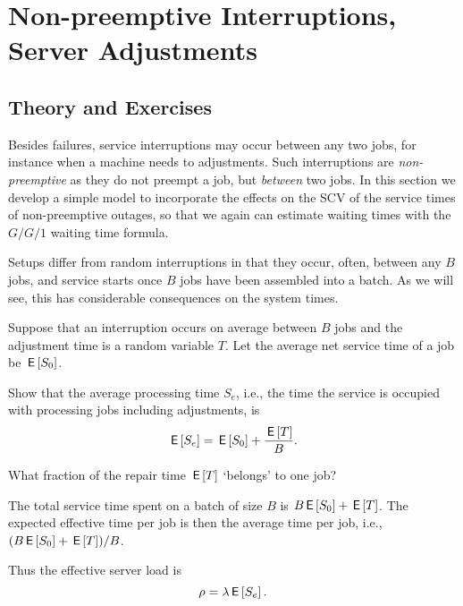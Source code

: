 \section{Non-preemptive Interruptions, Server Adjustments}
\label{sec:non-preempt-interr}

\subsection*{Theory and Exercises}



Besides failures, service interruptions  may occur between any two jobs, for instance when a machine needs to adjustments. Such interruptions are \emph{non-preemptive} as they do not preempt a job, 
but  \emph{between} two jobs.  In this section we develop a simple model to incorporate the effects on the SCV of the service times of non-preemptive outages, so that we again can estimate waiting times with the $G/G/1$ waiting time formula. 


Setups differ from random interruptions in that they occur, often, between any $B$ jobs, and service starts once $B$ jobs have been assembled into a batch. As we will see, this has considerable consequences on the system times. 


Suppose that an interruption occurs on average between $B$ jobs and the adjustment time is a random variable $T$. Let the average net service time of a job be $\,\mathsf{E}\left[S_0\right]$. 
\begin{exercise}
  Show that the average  processing time $S_e$, i.e., the time the service is occupied with processing jobs including adjustments, is 
  \begin{equation*}
    \,\mathsf{E}\left[S_e\right] = \,\mathsf{E}\left[S_0\right] + \frac{\,\mathsf{E}\left[T\right]} B.
  \end{equation*}
  \begin{hint}
    What fraction of the repair time $\,\mathsf{E}\left[T\right]$ `belongs' to one job?
  \end{hint}
  \begin{solution}
    The total service time spent on a batch of size $B$ is $B \,\mathsf{E}\left[S_0\right] + \,\mathsf{E}\left[T\right]$. The expected effective time per job is then the average time per job, i.e.,  $(B \,\mathsf{E}\left[S_0\right]+\,\mathsf{E}\left[T\right])/B$. 
  \end{solution}
\end{exercise}

Thus the effective server load is
\begin{equation*}
  \rho = \lambda \,\mathsf{E}\left[S_e\right].
\end{equation*}

